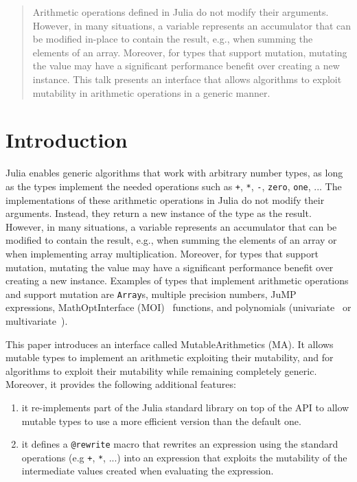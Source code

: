 \documentclass{juliacon}
\begin{document}


\maketitle

\begin{abstract}

Arithmetic operations defined in Julia do not modify their arguments.
However, in many situations, a variable represents an accumulator that can be modified in-place to contain the result, e.g., when summing the elements of an array.
Moreover, for types that support mutation, mutating the value may have a significant performance benefit over creating a new instance.
This talk presents an interface that allows algorithms to exploit mutability in arithmetic operations in a generic manner.

\end{abstract}

\section{Introduction}

Julia enables generic algorithms that work with arbitrary number types, as long as the types implement the needed operations
such as \texttt{+}, \texttt{*}, \texttt{-}, \texttt{zero}, \texttt{one}, ...
The implementations of these arithmetic operations in Julia do not modify their arguments. Instead, they return a new instance of the type as the result.
However, in many situations, a variable represents an accumulator that can be modified to contain the result, e.g.,
when summing the elements of an array or when implementing array multiplication.
Moreover, for types that support mutation, mutating the value may have a significant performance benefit over creating a new instance.
Examples of types that implement arithmetic operations and support mutation are \texttt{Array}s, multiple precision numbers, JuMP~\cite{dunning2017jump} expressions, MathOptInterface (MOI)~\cite{legat2021mathoptinterface} functions, and polynomials (univariate~\cite{verzani2021polynomials} or multivariate~\cite{legat2021multivariatepolynomials}).

This paper introduces an interface called MutableArithmetics (MA).
It allows mutable types to implement an arithmetic exploiting their mutability, and for algorithms to
exploit their mutability while remaining completely generic.
Moreover, it provides the following additional features:
\begin{enumerate}
  \item
    \label{item:reimplement}
    it re-implements part of the Julia standard library on top of the API to allow mutable types to use a more efficient version than the default one.
  \item
    \label{item:rewrite}
    it defines a \texttt{@rewrite} macro that rewrites an expression using the standard operations (e.g \texttt{+}, \texttt{*}, ...) into an expression that exploits the mutability of the intermediate values created when evaluating the expression.
\end{enumerate}
\end{document}
